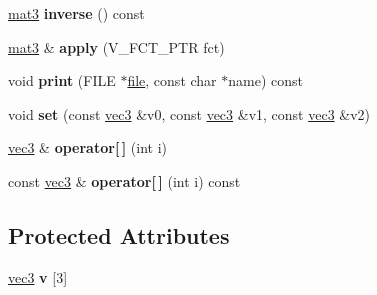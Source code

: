 \begin{DoxyCompactItemize}
\item 
\hypertarget{classmat3_a4668ed7cda236044eaa7a4d77f569432}{\hyperlink{classmat3}{mat3} {\bfseries inverse} () const }\label{classmat3_a4668ed7cda236044eaa7a4d77f569432}

\item 
\hypertarget{classmat3_af9bebf7319a26dd99cf7cdb9212e419f}{\hyperlink{classmat3}{mat3} \& {\bfseries apply} (V\+\_\+\+F\+C\+T\+\_\+\+P\+T\+R fct)}\label{classmat3_af9bebf7319a26dd99cf7cdb9212e419f}

\item 
\hypertarget{classmat3_a36d397e7b54f70c67a74bc1cfb3d11e8}{void {\bfseries print} (F\+I\+L\+E $\ast$\hyperlink{structfile}{file}, const char $\ast$name) const }\label{classmat3_a36d397e7b54f70c67a74bc1cfb3d11e8}

\item 
\hypertarget{classmat3_aaaf37c4e57c58e42bf2b10cb3798ad50}{void {\bfseries set} (const \hyperlink{classvec3}{vec3} \&v0, const \hyperlink{classvec3}{vec3} \&v1, const \hyperlink{classvec3}{vec3} \&v2)}\label{classmat3_aaaf37c4e57c58e42bf2b10cb3798ad50}

\item 
\hypertarget{classmat3_ae44b2c7da5e1d0fa87b30d7d00f4e4f3}{\hyperlink{classvec3}{vec3} \& {\bfseries operator\mbox{[}$\,$\mbox{]}} (int i)}\label{classmat3_ae44b2c7da5e1d0fa87b30d7d00f4e4f3}

\item 
\hypertarget{classmat3_a5347c8208eb43b251b6bd779af3da963}{const \hyperlink{classvec3}{vec3} \& {\bfseries operator\mbox{[}$\,$\mbox{]}} (int i) const }\label{classmat3_a5347c8208eb43b251b6bd779af3da963}

\end{DoxyCompactItemize}
\subsection*{Protected Attributes}
\begin{DoxyCompactItemize}
\item 
\hypertarget{classmat3_a6ea9325bd4f99b8bf81868b87f626b6b}{\hyperlink{classvec3}{vec3} {\bfseries v} \mbox{[}3\mbox{]}}\label{classmat3_a6ea9325bd4f99b8bf81868b87f626b6b}

\end{DoxyCompactItemize}
